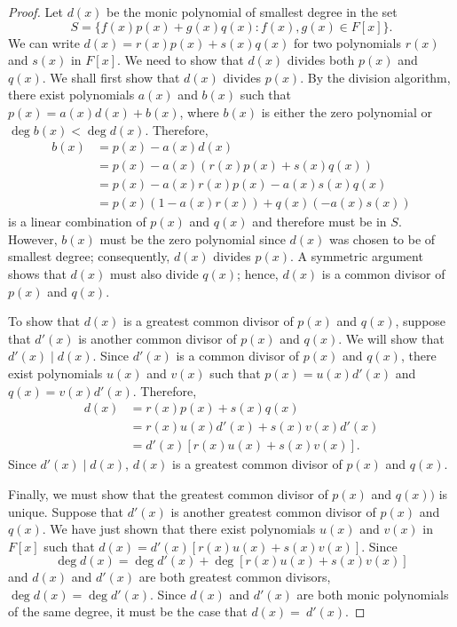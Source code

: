  
\begin{proof}
Let $d(x)$ be the monic polynomial of smallest degree in the set 
\[
S = \{ f(x) p(x) + g(x) q(x) : f(x), g(x) \in F[x]  \}.
\]
 We can write
$d(x) = r(x) p(x) + s(x) q(x)$ for two polynomials  $r(x)$ and $s(x)$
in $F[x]$. We need to show that $d(x)$ divides both $p(x)$ and $q(x)$.
We shall first show that $d(x)$ divides $p(x)$. By the division
algorithm, there exist polynomials $a(x)$ and $b(x)$ such that
$p(x) = a(x) d(x) + b(x)$, where $b(x)$ is either the
zero polynomial or $\deg b(x) < \deg d(x)$.  Therefore, 
\begin{align*}
b(x) & = p(x) - a(x) d(x) \\
& = p(x) - a(x)( r(x) p(x) + s(x) q(x))  \\
& = p(x) - a(x) r(x) p(x) - a(x)  s(x) q(x) \\
& = p(x)( 1  - a(x) r(x) ) + q(x) ( - a(x)  s(x) )
\end{align*}
is a linear combination of $p(x)$ and $q(x)$ and therefore must be in
$S$. However, $b(x)$ must be the zero polynomial since $d(x)$ was
chosen to be of smallest degree; consequently, $d(x)$ divides $p(x)$. 
A symmetric argument shows that $d(x)$ must also divide $q(x)$; hence,
$d(x)$ is a common divisor of $p(x)$ and $q(x)$. 
 
 
To show that $d(x)$ is a greatest common divisor of $p(x)$ and $q(x)$,
suppose that $d'(x)$ is another common divisor of $p(x)$ and $q(x)$.
We will show that $d'(x) \mid d(x)$.  Since $d'(x)$ is a common
divisor of $p(x)$ and $q(x)$, there exist polynomials $u(x)$ and
$v(x)$ such that $p(x) = u(x) d'(x)$ and $q(x) = v(x) d'(x)$.
Therefore, 
\begin{align*}
d(x) & = r(x) p(x) + s(x) q(x) \\
& =  r(x) u(x) d'(x) + s(x) v(x) d'(x) \\
& = d'(x) [r(x) u(x) + s(x) v(x)].
\end{align*}
Since $d'(x) \mid d(x)$, $d(x)$ is a greatest common divisor of $p(x)$ 
and $q(x)$.
 
 
Finally, we must show that the greatest common divisor of $p(x)$ and
$q(x))$ is unique. Suppose that $d'(x)$ is another greatest common
divisor of $p(x)$ and $q(x)$. We have just shown that there exist
polynomials $u(x)$ and $v(x)$ in $F[x]$ such that $d(x) = d'(x)[r(x)
u(x) + s(x) v(x)]$. Since 
\[
\deg d(x) =  \deg d'(x) + \deg[r(x) u(x) + s(x) v(x)]
\]
and $d(x)$ and $d'(x)$ are both greatest common divisors, $\deg d(x) =
\deg d'(x)$. Since $d(x)$ and $d'(x)$ are both monic polynomials of
the same degree, it must be the case that $d(x) =~d'(x)$.
\end{proof}
 
